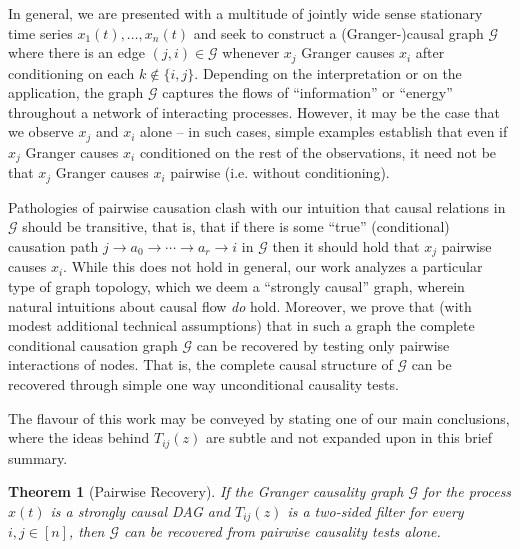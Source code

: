 \documentclass[12pt]{article}
\newtheorem{theorem}{Theorem}
\def\gcg{\mathcal{G}}  %
\begin{document}
In general, we are presented with a multitude of jointly wide sense
stationary time series $x_1(t), \ldots, x_n(t)$ and seek to construct
a (Granger-)causal graph $\gcg$ where there is an edge
$(j, i) \in \gcg$ whenever $x_j$ Granger causes $x_i$ after
conditioning on each $k \not\in \{i, j\}$.  Depending on the
interpretation or on the application, the graph $\gcg$ captures the
flows of ``information'' or ``energy'' throughout a network of
interacting processes.  However, it may be the case that we observe
$x_j$ and $x_i$ alone -- in such cases, simple examples establish that
even if $x_j$ Granger causes $x_i$ conditioned on the rest of the
observations, it need not be that $x_j$ Granger causes $x_i$ pairwise
(i.e. without conditioning).

Pathologies of pairwise causation clash with our intuition that causal
relations in $\gcg$ should be transitive, that is, that if there is
some ``true'' (conditional) causation path
$j \rightarrow a_0 \rightarrow \cdots \rightarrow a_r \rightarrow i$
in $\gcg$ then it should hold that $x_j$ pairwise causes $x_i$.  While
this does not hold in general, our work analyzes a particular type of
graph topology, which we deem a ``strongly causal'' graph, wherein
natural intuitions about causal flow \textit{do} hold.  Moreover, we
prove that (with modest additional technical assumptions) that in such
a graph the complete conditional causation graph $\gcg$ can be
recovered by testing only pairwise interactions of nodes.  That is,
the complete causal structure of $\gcg$ can be recovered through
simple one way unconditional causality tests.

The flavour of this work may be conveyed by stating one of our main
conclusions, where the ideas behind $T_{ij}(z)$ are subtle and not
expanded upon in this brief summary.

\begin{theorem}[Pairwise Recovery]
  \label{thm:scg_recovery}
  If the Granger causality graph $\gcg$ for the process $x(t)$ is
  a strongly causal DAG and $T_{ij}(z)$ is a two-sided filter for every
  $i, j \in [n]$, then $\gcg$ can be recovered from pairwise causality
  tests alone.
\end{theorem}

\end{document}
